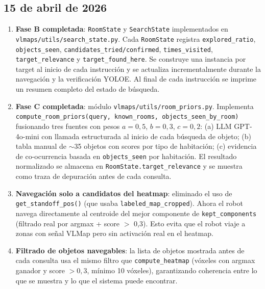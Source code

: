 \subsection*{15 de abril de 2026}

\begin{enumerate}
  \item \textbf{Fase B completada}: \texttt{RoomState} y \texttt{SearchState}
        implementados en \texttt{vlmaps/utils/search\_state.py}. Cada
        \texttt{RoomState} registra \texttt{explored\_ratio}, \texttt{objects\_seen},
        \texttt{candidates\_tried/confirmed}, \texttt{times\_visited},
        \texttt{target\_relevance} y \texttt{target\_found\_here}. Se construye una
        instancia por target al inicio de cada instrucción y se actualiza
        incrementalmente durante la navegación y la verificación YOLOE. Al final de
        cada instrucción se imprime un resumen completo del estado de búsqueda.

  \item \textbf{Fase C completada}: módulo \texttt{vlmaps/utils/room\_priors.py}.
        Implementa \texttt{compute\_room\_priors(query, known\_rooms,
        objects\_seen\_by\_room)} fusionando tres fuentes con pesos
        $a=0{,}5$, $b=0{,}3$, $c=0{,}2$: (a) LLM GPT-4o-mini con llamada
        estructurada al inicio de cada búsqueda de objeto; (b) tabla manual de
        $\sim$35 objetos con scores por tipo de habitación; (c) evidencia de
        co-ocurrencia basada en \texttt{objects\_seen} por habitación. El resultado
        normalizado se almacena en \texttt{RoomState.target\_relevance} y se
        muestra como traza de depuración antes de cada consulta.

  \item \textbf{Navegación solo a candidatos del heatmap}: eliminado el uso de
        \texttt{get\_standoff\_pos()} (que usaba \texttt{labeled\_map\_cropped}).
        Ahora el robot navega directamente al centroide del mejor componente de
        \texttt{kept\_components} (filtrado real por argmax + score $>$ 0{,}3).
        Esto evita que el robot viaje a zonas con señal VLMap pero sin activación
        real en el heatmap.

  \item \textbf{Filtrado de objetos navegables}: la lista de objetos mostrada antes
        de cada consulta usa el mismo filtro que \texttt{compute\_heatmap} (vóxeles
        con argmax ganador y score $> 0{,}3$, mínimo 10 vóxeles), garantizando
        coherencia entre lo que se muestra y lo que el sistema puede encontrar.


\end{enumerate}
